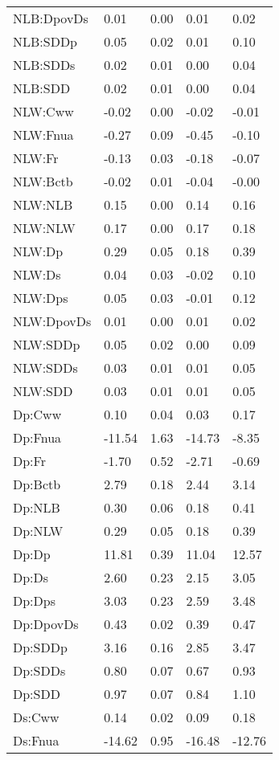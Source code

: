 \begin{center}
\begin{longtable}{|p{0.9in}|p{0.7in}|p{0.7in}|p{0.7in}|p{0.7in}|}
   NLB:DpovDs & 0.01 & 0.00 & 0.01 & 0.02 \\ 
   NLB:SDDp & 0.05 & 0.02 & 0.01 & 0.10 \\ 
   NLB:SDDs & 0.02 & 0.01 & 0.00 & 0.04 \\ 
   NLB:SDD & 0.02 & 0.01 & 0.00 & 0.04 \\ 
   NLW:Cww & -0.02 & 0.00 & -0.02 & -0.01 \\ 
   NLW:Fnua & -0.27 & 0.09 & -0.45 & -0.10 \\ 
   NLW:Fr & -0.13 & 0.03 & -0.18 & -0.07 \\ 
   NLW:Bctb & -0.02 & 0.01 & -0.04 & -0.00 \\ 
   NLW:NLB & 0.15 & 0.00 & 0.14 & 0.16 \\ 
   NLW:NLW & 0.17 & 0.00 & 0.17 & 0.18 \\ 
   NLW:Dp & 0.29 & 0.05 & 0.18 & 0.39 \\ 
   NLW:Ds & 0.04 & 0.03 & -0.02 & 0.10 \\ 
   NLW:Dps & 0.05 & 0.03 & -0.01 & 0.12 \\ 
   NLW:DpovDs & 0.01 & 0.00 & 0.01 & 0.02 \\ 
   NLW:SDDp & 0.05 & 0.02 & 0.00 & 0.09 \\ 
   NLW:SDDs & 0.03 & 0.01 & 0.01 & 0.05 \\ 
   NLW:SDD & 0.03 & 0.01 & 0.01 & 0.05 \\ 
   Dp:Cww & 0.10 & 0.04 & 0.03 & 0.17 \\ 
   Dp:Fnua & -11.54 & 1.63 & -14.73 & -8.35 \\ 
   Dp:Fr & -1.70 & 0.52 & -2.71 & -0.69 \\ 
   Dp:Bctb & 2.79 & 0.18 & 2.44 & 3.14 \\ 
   Dp:NLB & 0.30 & 0.06 & 0.18 & 0.41 \\ 
   Dp:NLW & 0.29 & 0.05 & 0.18 & 0.39 \\ 
   Dp:Dp & 11.81 & 0.39 & 11.04 & 12.57 \\ 
   Dp:Ds & 2.60 & 0.23 & 2.15 & 3.05 \\ 
   Dp:Dps & 3.03 & 0.23 & 2.59 & 3.48 \\ 
   Dp:DpovDs & 0.43 & 0.02 & 0.39 & 0.47 \\ 
   Dp:SDDp & 3.16 & 0.16 & 2.85 & 3.47 \\ 
   Dp:SDDs & 0.80 & 0.07 & 0.67 & 0.93 \\ 
   Dp:SDD & 0.97 & 0.07 & 0.84 & 1.10 \\ 
   Ds:Cww & 0.14 & 0.02 & 0.09 & 0.18 \\ 
   Ds:Fnua & -14.62 & 0.95 & -16.48 & -12.76 \\ 

\end{longtable}
\end{center}
